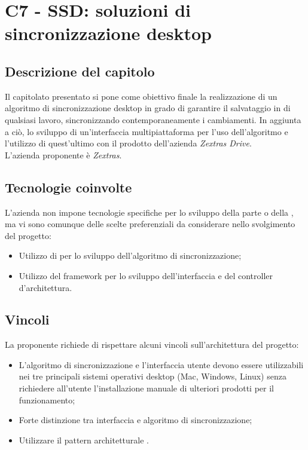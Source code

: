 \section{C7 - SSD: soluzioni di sincronizzazione desktop}

\subsection{Descrizione del capitolo}
Il capitolato presentato si pone come obiettivo finale la realizzazione di un algoritmo di sincronizzazione desktop in grado di garantire il salvataggio in  di qualsiasi lavoro, sincronizzando contemporaneamente i cambiamenti. In aggiunta a ciò, lo sviluppo di un'interfaccia multipiattaforma per l'uso dell'algoritmo e l'utilizzo di quest'ultimo con il prodotto dell'azienda \textit{Zextras Drive}.\\
L'azienda proponente è \textit{Zextras}.

\subsection{Tecnologie coinvolte}
L'azienda non impone tecnologie specifiche per lo sviluppo della parte  o della , ma vi sono comunque delle scelte preferenziali da considerare nello svolgimento del progetto:
\begin{itemize}
\item Utilizzo di  per lo sviluppo dell'algoritmo di sincronizzazione;
\item Utilizzo del framework  per lo sviluppo dell'interfaccia e del controller d'architettura.
\end{itemize}

\subsection{Vincoli}
La proponente richiede di rispettare alcuni vincoli sull'architettura del progetto: 
\begin{itemize}
\item L'algoritmo di sincronizzazione e l'interfaccia utente devono essere utilizzabili nei tre principali sistemi operativi desktop (Mac, Windows, Linux) senza richiedere all'utente l'installazione manuale di ulteriori prodotti per il funzionamento; 
\item Forte distinzione tra interfaccia e algoritmo di sincronizzazione; 
\item Utilizzare il pattern architetturale .
\end{itemize}

